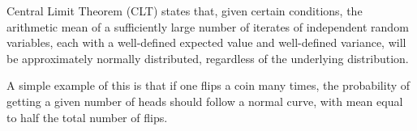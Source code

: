 \begin{slide} 
Central Limit Theorem (CLT) states that, given certain conditions, the arithmetic mean of a sufficiently large number of iterates of independent random variables, each with a well-defined expected value and well-defined variance, will be approximately normally distributed, regardless of the underlying distribution.

\par
A simple example of this is that if one flips a coin many times, the probability of getting a given number of heads should follow a normal curve, with mean equal to half the total number of flips.
\end{slide}


